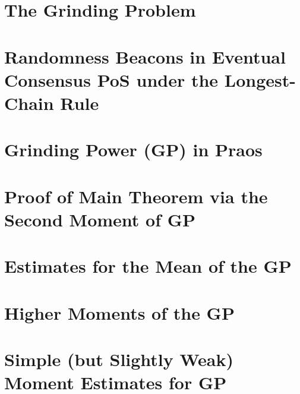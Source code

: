 


\chapter{The Grinding Problem}\label{sec:grinding-intro}


\chapter{Randomness Beacons in Eventual Consensus PoS under the Longest-Chain Rule}\label{sec:model-grinding}


% 

\chapter{Grinding Power (GP) in Praos}\label{sec:praos}



\chapter{Proof of Main Theorem via the Second Moment of GP}\label{sec:praos-second-moment}\label{sec:main-theorems}





\chapter{Estimates for the Mean of the GP}\label{sec:praos-mean}



\chapter{Higher Moments of the GP}\label{sec:praos-higher-moments}



\chapter{Simple (but Slightly Weak) Moment Estimates for GP}\label{sec:praos-simple-moments}



